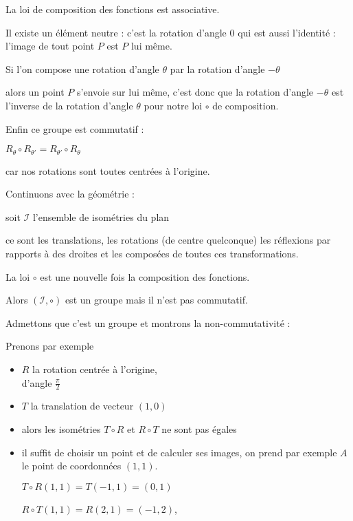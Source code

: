 \change

La loi de composition des fonctions est associative. 

\change

Il existe un élément neutre : c'est la rotation d'angle $0$
qui est aussi l'identité  : l'image de tout point $P$ est $P$ lui même.

\change

Si l'on compose une rotation d'angle $\theta$ par la rotation d'angle $-\theta$

alors un point $P$ s'envoie sur lui même, c'est donc que la rotation d'angle $-\theta$
est l'inverse de la rotation d'angle $\theta$ pour notre loi $\circ$ de composition.

\change

Enfin ce groupe est commutatif  :

$R_\theta \circ R_{\theta'}=R_{\theta'} \circ R_{\theta}$

car nos rotations sont toutes centrées à l'origine.


\diapo

Continuons avec la géométrie :

soit $\mathcal{I}$ l'ensemble de isométries du plan 

ce sont les translations, les rotations (de centre quelconque)
les réflexions par rapports à des droites et les composées de toutes ces transformations.

La loi $\circ$ est une nouvelle fois la composition des fonctions.

Alors $(\mathcal{I},\circ)$ est un groupe mais il n'est pas commutatif.

\change

Admettons que c'est un groupe et montrons la non-commutativité :

Prenons par exemple 

  \begin{itemize}
     \item $R$ la rotation centrée à l'origine,\\ d'angle $\frac \pi 2$
     \item $T$ la translation de vecteur $(1,0)$
     \item alors les isométries  $T \circ R$ et $R \circ T$ ne sont pas égales

\change

     \item il suffit de choisir un point et de calculer ses images,
on prend par exemple $A$ le point de coordonnées $(1,1)$.


$T \circ R (1,1) = T (-1,1) = (0,1)$

 $R\circ T(1,1) = R(2,1) = (-1,2)$,

  \end{itemize}

